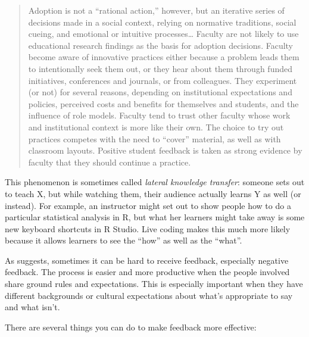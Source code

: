 \begin{quote}

  Adoption is not a ``rational action,'' however, but an iterative
  series of decisions made in a social context, relying on normative
  traditions, social cueing, and emotional or intuitive
  processes{\ldots} Faculty are not likely to use educational research
  findings as the basis for adoption decisions. Faculty become aware
  of innovative practices either because a problem leads them to
  intentionally seek them out, or they hear about them through funded
  initiatives, conferences and journals, or from colleagues. They
  experiment (or not) for several reasons, depending on institutional
  expectations and policies, perceived costs and benefits for
  themselves and students, and the influence of role models. Faculty
  tend to trust other faculty whose work and institutional context is
  more like their own. The choice to try out practices competes with
  the need to ``cover'' material, as well as with classroom
  layouts. Positive student feedback is taken as strong evidence by
  faculty that they should continue a practice.

\end{quote}

This phenomenon is sometimes called \emph{lateral knowledge transfer}:
someone sets out to teach X, but while watching them, their audience
actually learns Y as well (or instead). For example, an instructor
might set out to show people how to do a particular statistical
analysis in R, but what her learners might take away is some new
keyboard shortcuts in R Studio. Live coding makes this much more
likely because it allows learners to see the ``how'' as well as the
``what''.




As  suggests, sometimes it can be hard to receive
feedback, especially negative feedback.  The process is easier and
more productive when the people involved share ground rules and
expectations. This is especially important when they have different
backgrounds or cultural expectations about what's appropriate to say
and what isn't.

There are several things you can do to make feedback more effective:

